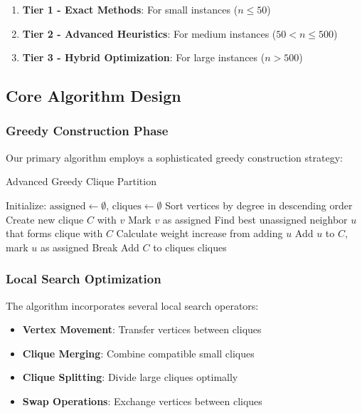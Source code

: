 \documentclass[12pt,a4paper]{article}
\begin{document}
\begin{enumerate}
    \item \textbf{Tier 1 - Exact Methods}: For small instances ($n \leq 50$)
    \item \textbf{Tier 2 - Advanced Heuristics}: For medium instances ($50 < n \leq 500$)
    \item \textbf{Tier 3 - Hybrid Optimization}: For large instances ($n > 500$)
\end{enumerate}

\subsection{Core Algorithm Design}

\subsubsection{Greedy Construction Phase}

Our primary algorithm employs a sophisticated greedy construction strategy:

\begin{algorithm}
\caption{Advanced Greedy Clique Partition}
\begin{algorithmic}[1]
\STATE Initialize: $\text{assigned} \leftarrow \emptyset$, $\text{cliques} \leftarrow \emptyset$
\STATE Sort vertices by degree in descending order
    \STATE Create new clique $C$ with $v$
    \STATE Mark $v$ as assigned
        \STATE Find best unassigned neighbor $u$ that forms clique with $C$
        \STATE Calculate weight increase from adding $u$
            \STATE Add $u$ to $C$, mark $u$ as assigned
        \ELSE
            \STATE Break
        \ENDIF
    \ENDWHILE
    \STATE Add $C$ to cliques
\ENDFOR
\RETURN cliques
\end{algorithmic}
\end{algorithm}

\subsubsection{Local Search Optimization}

The algorithm incorporates several local search operators:

\begin{itemize}
    \item \textbf{Vertex Movement}: Transfer vertices between cliques
    \item \textbf{Clique Merging}: Combine compatible small cliques
    \item \textbf{Clique Splitting}: Divide large cliques optimally
    \item \textbf{Swap Operations}: Exchange vertices between cliques
\end{itemize}
\end{document}
